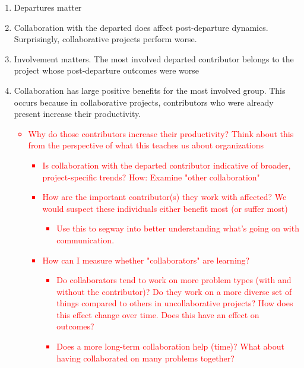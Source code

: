 \documentclass[12pt,notitlepage]{article}
\begin{document}
\begin{enumerate}
    \item Departures matter
    \item Collaboration with the departed does affect post-departure dynamics. Surprisingly, collaborative projects perform worse. 
    \item Involvement matters. The most involved departed contributor belongs to the project whose post-departure outcomes were worse
    \item Collaboration has large positive benefits for the most involved group. This occurs because in collaborative projects, contributors who were already present increase their productivity. 
    \textcolor{red}{
        \begin{itemize}
            \item Why do those contributors increase their productivity? Think about this from the perspective of what this teaches us about organizations
            \begin{itemize}
                \item Is collaboration with the departed contributor indicative of broader, project-specific trends? How: Examine "other collaboration"
                \item How are the important contributor(s) they work with affected? We would suspect these individuals either benefit most (or suffer most)
                \begin{itemize}
                    \item Use this to segway into better understanding what's going on with communication. 
                \end{itemize}
                \item How can I measure whether "collaborators" are learning?
                \begin{itemize}
                    \item Do collaborators tend to work on more problem types (with and without the contributor)? Do they work on a more diverse set of things compared to others in uncollaborative projects? How does this effect change over time. Does this have an effect on outcomes?
                    \item Does a more long-term collaboration help (time)? What about having collaborated on many problems together?

\end{itemize}
\end{itemize}
\end{itemize}}
\end{enumerate}
\end{document}
